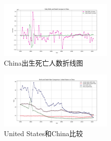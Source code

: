 \documentclass{ctexart}
\begin{document}
    \begin{figure}[h!]
        \centering
        \includegraphics[width=0.5\textwidth]{img/China出生死亡人数折线图.png}
        \caption{China出生死亡人数折线图}
        \label{9}
    \end{figure}

    \begin{figure}[h!]
        \centering
        \includegraphics[width=0.5\textwidth]{img/United States_China比较.png}
        \caption{United States和China比较}
        \label{10}
    \end{figure}

    

    
\end{document}
